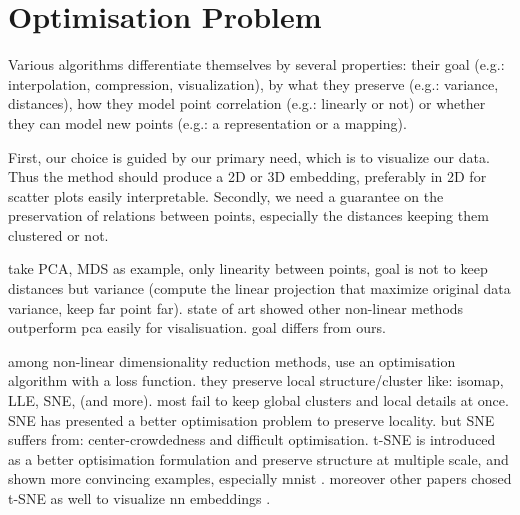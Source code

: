 \documentclass[a4paper,12pt]{report}
\newcommand{\eg}{e.g.}
\begin{document}
\section{Optimisation Problem}
Various algorithms differentiate themselves by several properties: their goal (\eg: interpolation, compression, visualization), by what they preserve (\eg: variance, distances), how they model point correlation (\eg: linearly or not) or whether they can model new points (\eg: a representation or a mapping).

First, our choice is guided by our primary need, which is to visualize our data.
Thus the method should produce a 2D or 3D embedding, preferably in 2D for scatter plots easily interpretable.
Secondly, we need a guarantee on the preservation of relations between points, especially the distances keeping them clustered or not.

take PCA, MDS as example, only linearity between points, goal is not to keep distances but variance (compute the linear projection that maximize original data variance, keep far point far).
state of art showed other non-linear methods outperform pca easily for visalisuation.
goal differs from ours.

among non-linear dimensionality reduction methods, use an optimisation algorithm with a loss function.
they preserve local structure/cluster like: isomap, LLE, SNE, (and more).
most fail to keep global clusters and local details at once.
SNE has presented a better optimisation problem to preserve locality\cite{SNE}.
but SNE suffers from: center-crowdedness and difficult optimisation.
t-SNE is introduced as a better optisimation formulation and preserve structure at multiple scale, and shown more convincing examples, especially mnist \cite{t-SNE}.
moreover other papers chosed t-SNE as well to visualize nn embeddings \cite{yu2014visualizing}\cite{yaotiny}\cite{donahue2013decaf}.
\end{document}
